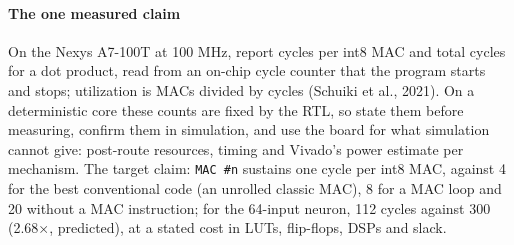 \paragraph{The one measured claim} On the Nexys A7-100T at 100 MHz, report cycles per int8 MAC and total cycles for a dot product, read from an on-chip cycle counter that the program starts and stops; utilization is MACs divided by cycles (Schuiki et al., 2021). On a deterministic core these counts are fixed by the RTL, so state them before measuring, confirm them in simulation, and use the board for what simulation cannot give: post-route resources, timing and Vivado's power estimate per mechanism. The target claim: \texttt{MAC \#n} sustains one cycle per int8 MAC, against 4 for the best conventional code (an unrolled classic MAC), 8 for a MAC loop and 20 without a MAC instruction; for the 64-input neuron, 112 cycles against 300 (2.68×, predicted), at a stated cost in LUTs, flip-flops, DSPs and slack.

